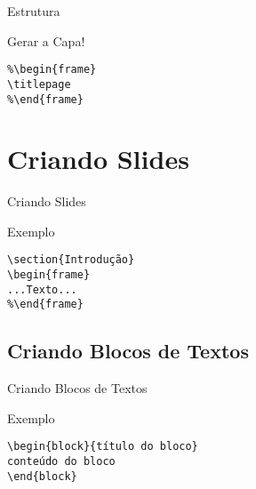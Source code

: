 \documentclass{beamer}
\begin{document}
\begin{frame}[fragile]{Estrutura}
\begin{block}{Gerar a Capa!}
\begin{verbatim}
%\begin{frame}
\titlepage
%\end{frame}
\end{verbatim}
\end{block}
\end{frame}

\section{Criando Slides}
\begin{frame}[fragile]{Criando Slides}
\begin{block}{Exemplo}
\begin{verbatim}
\section{Introdução}
\begin{frame}
...Texto...
%\end{frame}
\end{verbatim}
\end{block}
\end{frame}

\subsection{Criando Blocos de Textos}
\begin{frame}[fragile]{Criando Blocos de Textos}
\begin{block}{Exemplo}
\begin{verbatim}
\begin{block}{título do bloco}
conteúdo do bloco
\end{block}
\end{verbatim}
\end{block}
\end{frame}
\end{document}
